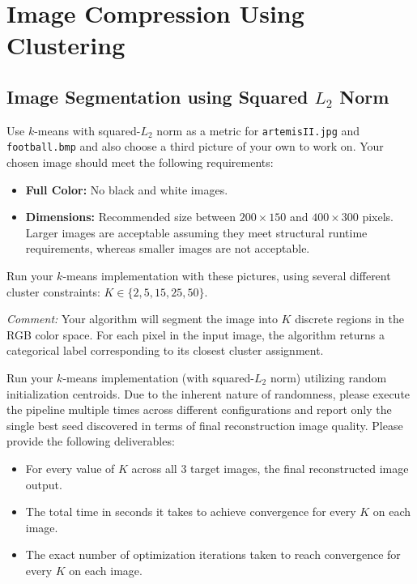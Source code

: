 \documentclass[twoside, 10pt]{article}
\begin{document}
\section{Image Compression Using Clustering}

\subsection{Image Segmentation using Squared $L_2$ Norm}

Use $k$-means with squared-$L_2$ norm as a metric for \texttt{artemisII.jpg} and \texttt{football.bmp} and also choose a third picture of your own to work on. Your chosen image should meet the following requirements:

\begin{itemize}
    \item \textbf{Full Color:} No black and white images.
    \item \textbf{Dimensions:} Recommended size between $200 \times 150$ and $400 \times 300$ pixels. Larger images are acceptable assuming they meet structural runtime requirements, whereas smaller images are not acceptable.
\end{itemize}

Run your $k$-means implementation with these pictures, using several different cluster constraints: $K \in \{2, 5, 15, 25, 50\}$.

{\textit{Comment:}} 
Your algorithm will segment the image into $K$ discrete regions in the RGB color space. For each pixel in the input image, the algorithm returns a categorical label corresponding to its closest cluster assignment.

Run your $k$-means implementation (with squared-$L_2$ norm) utilizing random initialization centroids. Due to the inherent nature of randomness, please execute the pipeline multiple times across different configurations and report only the single best seed discovered in terms of final reconstruction image quality. Please provide the following deliverables:
\begin{itemize}
    \item For every value of $K$ across all 3 target images, the final reconstructed image output.
    \item The total time in seconds it takes to achieve convergence for every $K$ on each image.
    \item The exact number of optimization iterations taken to reach convergence for every $K$ on each image.
\end{itemize}
\end{document}
